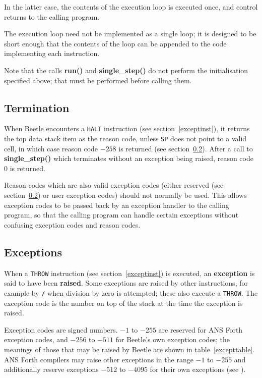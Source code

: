 \documentclass{article}
\begin{document}
In the latter case, the contents of the execution loop is executed once, and
control returns to the calling program.

The execution loop need not be implemented as a single loop; it  is designed to
be short enough that the contents of the loop can be appended  to the code
implementing each instruction.

Note that the calls {\bf run()} and {\bf single\_step()} do not perform the
initialisation specified above; that must be performed before calling them.


\subsection{Termination}

When Beetle encounters a {\tt HALT} instruction (see section~\ref{exceptinst}),
it returns the top data stack item as the reason code, unless {\tt SP} does not
point to a valid cell, in which case reason code $-258$ is returned (see section~\ref{exceptions}).
After a call to {\bf single\_step()} which terminates without
an exception being raised, reason code 0 is returned.

Reason codes which are also valid exception codes (either reserved (see section~\ref{exceptions})
or user exception codes) should not normally be used. This
allows exception codes to be passed back by an exception handler to the calling
program, so that the calling program can handle certain exceptions without
confusing exception codes and reason codes.


\subsection{Exceptions}
\label{exceptions}

When a {\tt THROW} instruction (see section~\ref{exceptinst}) is executed, an
{\bf exception} is said to have been {\bf raised}. Some exceptions are raised by
other instructions, for example by {\tt /} when division by zero is attempted;
these also execute a {\tt THROW}. The exception code is the number on top of the
stack at the time the exception is raised.

Exception codes are signed numbers. $-1$ to $-255$ are reserved for ANS Forth
exception codes, and $-256$ to $-511$ for Beetle's own exception codes; the meanings
of those that may be raised by Beetle are shown in table~\ref{excepttable}. ANS
Forth compilers may raise other exceptions in the range $-1$ to $-255$ and
additionally reserve exceptions $-512$ to $-4095$ for their own exceptions
(see \cite[section 9.3.1]{ANSIforth}).
\end{document}
